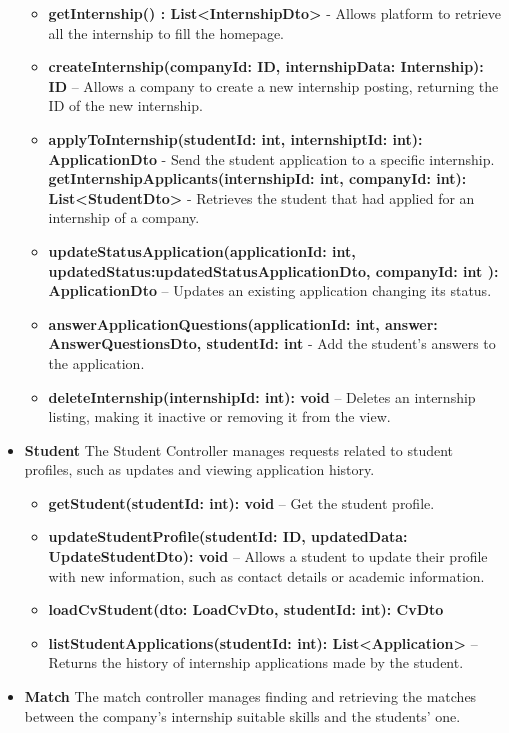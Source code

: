 \begin{itemize}
\begin{itemize}
\item \textbf{getInternship() : List<InternshipDto> } - Allows platform to retrieve all the internship to fill the homepage.
    \item \textbf{createInternship(companyId: ID, internshipData: Internship): ID} – Allows a company to create a new internship posting, returning the ID of the new internship.
    \item \textbf{applyToInternship(studentId: int, internshiptId: int): ApplicationDto} - Send the student application to a specific internship.
    \iterm \textbf{getInternshipApplicants(internshipId: int, companyId: int): List<StudentDto>} - Retrieves the student that had applied for an internship of a company.
    \item \textbf{updateStatusApplication(applicationId: int, updatedStatus:updatedStatusApplicationDto, companyId: int  ): ApplicationDto} – Updates an existing application changing its status.
    \item \textbf{answerApplicationQuestions(applicationId: int, answer: AnswerQuestionsDto, studentId: int} - Add the student's answers to the application.
    \item \textbf{deleteInternship(internshipId: int): void} – Deletes an internship listing, making it inactive or removing it from the view.
\end{itemize}



\item \textbf{Student}
The Student Controller manages requests related to student profiles, such as updates and viewing application history.

\begin{itemize}
    \item \textbf{getStudent(studentId: int): void} – Get the student profile.
    \item \textbf{updateStudentProfile(studentId: ID, updatedData: UpdateStudentDto): void} – Allows a student to update their profile with new information, such as contact details or academic information.
    \item \textbf{loadCvStudent(dto: LoadCvDto, studentId: int): CvDto}
    \item \textbf{listStudentApplications(studentId: int): List<Application>} – Returns the history of internship applications made by the student.
\end{itemize}

\item \textbf{Match}
The match controller manages finding and retrieving the matches between the company's internship suitable skills and the students' one.
\begin{itemize}


\end{itemize}
\end{itemize}
